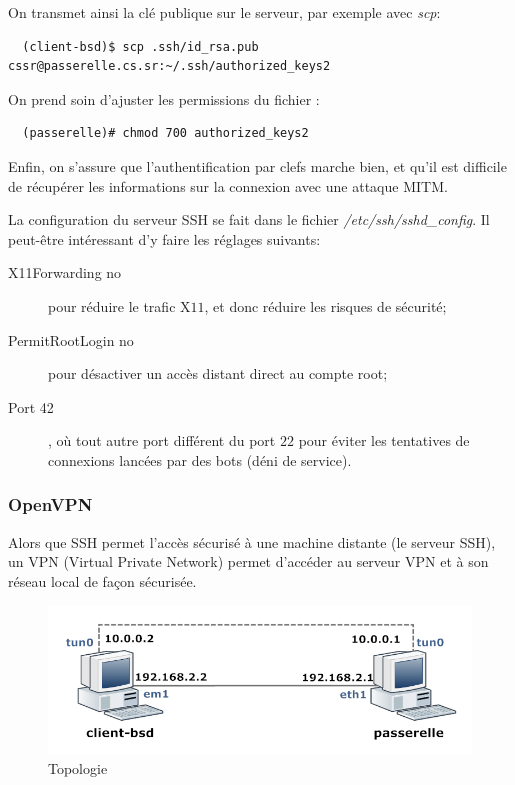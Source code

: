\documentclass[a4paper]{article}
\begin{document}
On transmet ainsi la clé publique sur le serveur, par exemple avec
\textit{scp}:
\begin{verbatim}
  (client-bsd)$ scp .ssh/id_rsa.pub cssr@passerelle.cs.sr:~/.ssh/authorized_keys2
\end{verbatim}

On prend soin d'ajuster les permissions du fichier :
\begin{verbatim}
  (passerelle)# chmod 700 authorized_keys2
\end{verbatim}
 
Enfin, on s'assure que l'authentification par clefs marche bien, et
qu'il est difficile de récupérer les informations sur la connexion
avec une attaque MITM.

La configuration du serveur SSH se fait dans le fichier \textit{/etc/ssh/sshd\_config}.
Il peut-être intéressant d'y faire les réglages suivants:
\begin{description}
	\item[X11Forwarding no] pour réduire le trafic X$11$, et donc réduire les
	risques de sécurité;
	\item[PermitRootLogin no] pour désactiver un accès distant direct au compte
	root;
	\item[Port 42], où tout autre port différent du port $22$ pour éviter les
	tentatives de connexions lancées par des bots (déni de service).
\end{description}

\subsubsection{OpenVPN}
Alors que SSH permet l'accès sécurisé à une machine distante (le serveur SSH),
un VPN (Virtual Private Network) permet d'accéder au serveur VPN et à son réseau local de façon sécurisée.

\begin{figure}[!ht]
	\centering
	\includegraphics[scale=.6]{VPN1.PNG}
	\caption{\label{vpn1} Topologie}
\end{figure}
\end{document}

